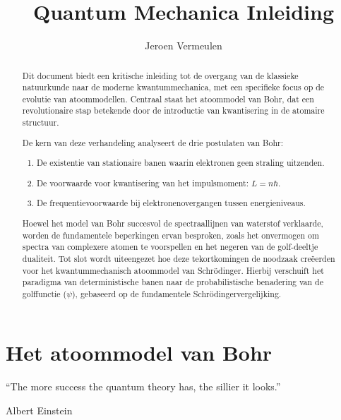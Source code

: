 \documentclass{report} %
\title{Quantum Mechanica Inleiding}
\author{Jeroen Vermeulen}
\date{}
\begin{document}
    \maketitle
    \tableofcontents
    \begin{abstract}
        Dit document biedt een kritische inleiding tot de overgang van de klassieke natuurkunde naar de moderne kwantummechanica, met een specifieke focus op de evolutie van atoommodellen. Centraal staat het atoommodel van Bohr, dat een revolutionaire stap betekende door de introductie van kwantisering in de atomaire structuur.

        De kern van deze verhandeling analyseert de drie postulaten van Bohr:
        \begin{enumerate}
            \item De existentie van stationaire banen waarin elektronen geen straling uitzenden.
            \item De voorwaarde voor kwantisering van het impulsmoment: $L = n\hbar$.
            \item De frequentievoorwaarde bij elektronenovergangen tussen energieniveaus.
        \end{enumerate}

        Hoewel het model van Bohr succesvol de spectraallijnen van waterstof verklaarde, worden de fundamentele beperkingen ervan besproken, zoals het onvermogen om spectra van complexere atomen te voorspellen en het negeren van de golf-deeltje dualiteit. Tot slot wordt uiteengezet hoe deze tekortkomingen de noodzaak creëerden voor het kwantummechanisch atoommodel van Schrödinger. Hierbij verschuift het paradigma van deterministische banen naar de probabilistische benadering van de golffunctie ($\psi$), gebaseerd op de fundamentele Schrödingervergelijking.
    \end{abstract}


    \chapter{Het atoommodel van Bohr}
    \epigraph{“The more success the quantum theory has, the sillier it looks.”}{Albert Einstein}
\end{document}
